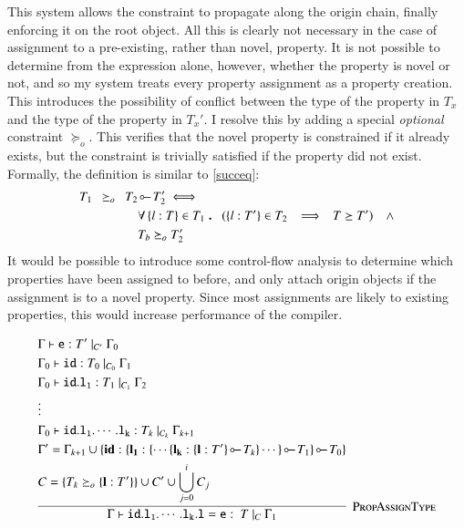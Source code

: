 \documentclass[12pt,a4paper,twoside,openright]{report}
\theoremstyle{definition}
\theoremstyle{dotless}
\newcommand*{\orig}{\ensuremath{\!\multimapinv\!}}
\newcommand\qdot{\mathbin{\scalebox{1.5}{.}}\enspace}
\begin{document}
This system allows the constraint to propagate along the origin chain, finally
enforcing it on the root object. All this is clearly not necessary in the case
of assignment to a pre-existing, rather than novel, property. It is not
possible to determine from the expression alone, however, whether the property
is novel or not, and so my system treats every property assignment as a
property creation. This introduces the possibility of conflict between the type
of the property in $T_x$ and the type of the property in $T_x'$. I resolve this
by adding a special \textit{optional} constraint $\succeq_o$. This verifies
that the novel property is constrained if it already exists, but the constraint
is trivially satisfied if the property did not exist. Formally, the definition
is similar to
\ref{succeq}:
\begin{equation}
  \begin{split}
	T_1\enspace \succeq_o\enspace T_2&\orig T_2' \iff \\
	& \forall \left\{l: T\right\} \in T_1 \qdot (\{l: T'\}\in T_2\enspace \implies \enspace T \succeq T') \quad\land \\
	& T_b \succeq_o T_2'
  \end{split}
  \label{succeqo}
\end{equation}
It would be possible to introduce some control-flow analysis to determine which 
properties have been assigned to before, and only attach origin objects if the
assignment is to a novel property. Since most assignments are likely to existing 
properties, this would increase performance of the compiler.

$$\infer[\textsc{PropAssignType}]{
  \Gamma\vdash\mathtt{id.l_1.\cdots.l_k.l = e}:\ T\ |_C\ \Gamma_1
}{
  \begin{split}
	&\Gamma\vdash\mathtt{e}:T'\ |_{C'}\ \Gamma_0 \\
	&\Gamma_0\vdash\mathtt{id}:T_0\ |_{C_0}\ \Gamma_1 \\
	&\Gamma_0\vdash\mathtt{id.l_1}:T_1\ |_{C_1}\ \Gamma_2 \\
	&\vdots \\
	&\Gamma_0\vdash\mathtt{id.l_1.\cdots.l_k}:T_k\ |_{C_k}\ \Gamma_{k+1} \\
	&\Gamma' = \Gamma_{k+1}\cup\{\textbf{id}: \{ \mathbf{l_1}: \{\cdots \{\mathbf{l_k}:\{\mathbf{l}: T'\}\orig T_k \} \cdots\} \orig T_1\}\orig T_0\} \\
	&C = \{T_k \succeq_o \{\mathbf{l}:T'\}\} \cup C' \cup \bigcup_{j=0}^{i}{C_j}
  \end{split}
}$$
\end{document}
